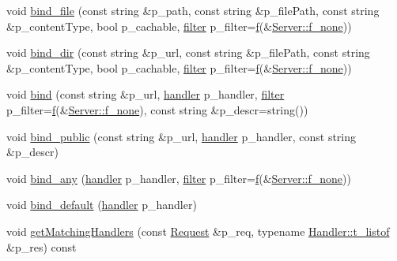 \begin{DoxyCompactItemize}
\item 
void \hyperlink{classxtd_1_1network_1_1http_1_1Server_a20602f089753d9aa01e389730d7c38fa}{bind\-\_\-file} (const string \&p\-\_\-path, const string \&p\-\_\-file\-Path, const string \&p\-\_\-content\-Type, bool p\-\_\-cachable, \hyperlink{structxtd_1_1network_1_1http_1_1Server_1_1Handler_1_1filter}{filter} p\-\_\-filter=\hyperlink{classxtd_1_1network_1_1http_1_1Server_a49f38021cb4d61f2c3027785f8fa561c}{f}(\&\hyperlink{classxtd_1_1network_1_1http_1_1Server_a1007cdff295e30f0009f07c70e8bafcc}{Server\-::f\-\_\-none}))
\item 
void \hyperlink{classxtd_1_1network_1_1http_1_1Server_a9c5984fbcd1ea24860660a670250cb36}{bind\-\_\-dir} (const string \&p\-\_\-url, const string \&p\-\_\-file\-Path, const string \&p\-\_\-content\-Type, bool p\-\_\-cachable, \hyperlink{structxtd_1_1network_1_1http_1_1Server_1_1Handler_1_1filter}{filter} p\-\_\-filter=\hyperlink{classxtd_1_1network_1_1http_1_1Server_a49f38021cb4d61f2c3027785f8fa561c}{f}(\&\hyperlink{classxtd_1_1network_1_1http_1_1Server_a1007cdff295e30f0009f07c70e8bafcc}{Server\-::f\-\_\-none}))
\item 
void \hyperlink{classxtd_1_1network_1_1http_1_1Server_a7281ae7cdda6d7b2334b27e530ce000f}{bind} (const string \&p\-\_\-url, \hyperlink{structxtd_1_1network_1_1http_1_1Server_1_1Handler_1_1handler}{handler} p\-\_\-handler, \hyperlink{structxtd_1_1network_1_1http_1_1Server_1_1Handler_1_1filter}{filter} p\-\_\-filter=\hyperlink{classxtd_1_1network_1_1http_1_1Server_a49f38021cb4d61f2c3027785f8fa561c}{f}(\&\hyperlink{classxtd_1_1network_1_1http_1_1Server_a1007cdff295e30f0009f07c70e8bafcc}{Server\-::f\-\_\-none}), const string \&p\-\_\-descr=string())
\item 
void \hyperlink{classxtd_1_1network_1_1http_1_1Server_a6bbc192f6029ae9b02ca75c25d5bd3c8}{bind\-\_\-public} (const string \&p\-\_\-url, \hyperlink{structxtd_1_1network_1_1http_1_1Server_1_1Handler_1_1handler}{handler} p\-\_\-handler, const string \&p\-\_\-descr)
\item 
void \hyperlink{classxtd_1_1network_1_1http_1_1Server_a8a14495899a4a6a4287597d8c7cc808a}{bind\-\_\-any} (\hyperlink{structxtd_1_1network_1_1http_1_1Server_1_1Handler_1_1handler}{handler} p\-\_\-handler, \hyperlink{structxtd_1_1network_1_1http_1_1Server_1_1Handler_1_1filter}{filter} p\-\_\-filter=\hyperlink{classxtd_1_1network_1_1http_1_1Server_a49f38021cb4d61f2c3027785f8fa561c}{f}(\&\hyperlink{classxtd_1_1network_1_1http_1_1Server_a1007cdff295e30f0009f07c70e8bafcc}{Server\-::f\-\_\-none}))
\item 
void \hyperlink{classxtd_1_1network_1_1http_1_1Server_ac5121491ca4ae4f9c062e513b1a8e507}{bind\-\_\-default} (\hyperlink{structxtd_1_1network_1_1http_1_1Server_1_1Handler_1_1handler}{handler} p\-\_\-handler)
\item 
void \hyperlink{classxtd_1_1network_1_1http_1_1Server_a895f176f94cc13d68a82b6718bdd20a0}{get\-Matching\-Handlers} (const \hyperlink{classxtd_1_1network_1_1http_1_1Request}{Request} \&p\-\_\-req, typename \hyperlink{classxtd_1_1network_1_1http_1_1Server_1_1Handler_af76f154d74b7f92f26852b8ea4829b72}{Handler\-::t\-\_\-listof} \&p\-\_\-res) const 
\end{DoxyCompactItemize}
